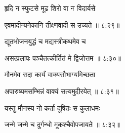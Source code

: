 
{\devanagarifont हृदि न स्फुटसे मूढ शिरो वा न विदार्यसे \thinspace{\dandab} \dontdisplaylinenum }%


{\devanagarifont एवमादीन्यनेकानि तीक्ष्णवादी स उच्यते {॥ ८:२९॥} \veg\dontdisplaylinenum }%
 


{\devanagarifont द्यूतभोजनयुद्धं च मद्यस्त्रीकथमेव च \thinspace{\dandab} \dontdisplaylinenum }%


{\devanagarifont असत्प्रलापः पञ्चैतत्कीर्तितं मे द्विजोत्तम {॥ ८:३०॥} \veg\dontdisplaylinenum }%

{\devanagarifont मौनमेव सदा कार्यं वाक्यसौभाग्यमिच्छता \thinspace{\dandab} \dontdisplaylinenum }%


{\devanagarifont अपारुष्यमसम्भिन्नं वाक्यं सत्यमुदीरयेत् {॥ ८:३१॥} \veg\dontdisplaylinenum }%

{\devanagarifont यस्तु मौनस्य नो कर्ता दूषितः स कुलाधमः \thinspace{\dandab} \dontdisplaylinenum }%


{\devanagarifont जन्मे जन्मे च दुर्गन्धो मूकश्चैवोपजायते {॥ ८:३२॥} \veg\dontdisplaylinenum }%

